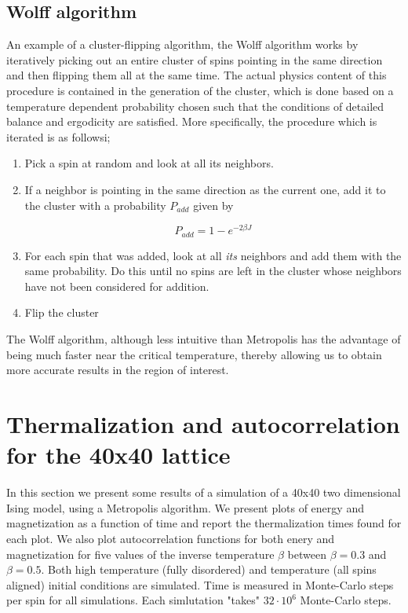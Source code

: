 \documentclass[11pt,a4paper]{article}
\begin{document}
\subsection{Wolff algorithm}
An example of a cluster-flipping algorithm, the Wolff algorithm works by iteratively picking out
 an entire cluster of spins pointing in the same direction and then flipping them all at the same time. The actual physics content of this 
 procedure is contained in the generation of the cluster, which is done based on a temperature dependent probability chosen such that the
 conditions of detailed balance and ergodicity are satisfied.
 More specifically, the procedure which is iterated is as followsi;
 \begin{enumerate}
 \item Pick a spin at random and look at all its neighbors.
 \item If a neighbor is pointing in the same direction as the current one, add it to the cluster with a probability $P_{add}$ given by

\begin{equation}\label{eq:A-ratio}
    P_{add} = 1 - e^{-2\beta J}
\end{equation}
 

 \item For each spin that was added, look at all \textit{its} neighbors and add them with the same probability. Do this until no spins are left
 in the cluster whose neighbors have not been considered for addition.
 \item Flip the cluster

 \end{enumerate}

The Wolff algorithm, although less intuitive than Metropolis has the advantage of being much faster near the critical temperature, thereby
 allowing us to obtain more accurate results in the region of interest.

\section{Thermalization and autocorrelation for the 40x40 lattice}


In this section we present some results of a simulation of a 40x40 two dimensional Ising model, using a Metropolis algorithm.
 We present plots of energy and magnetization as a function of time and report the thermalization times found for each plot.
 We also plot autocorrelation functions for both enery and magnetization
 for five values of the inverse temperature $\beta$ between $\beta = 0.3$ and $\beta = 0.5$. 
 Both high temperature (fully disordered) and temperature (all spins aligned) initial conditions are simulated.
 Time is measured in Monte-Carlo steps per spin for all simulations. Each simlutation "takes" $32\cdot 10^6$ 
 Monte-Carlo steps.
\end{document}
